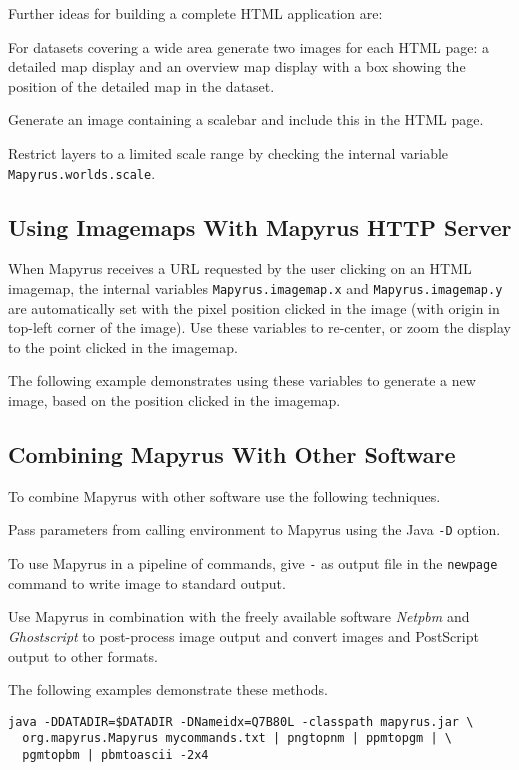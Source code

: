 Further ideas for building a complete HTML application are:

For datasets covering a wide area generate two images for
each HTML page: a detailed map display and an overview map display
with a box showing the position of the detailed map in the dataset.

Generate an image containing a scalebar
and include this in the HTML page.

Restrict layers to a limited scale range by checking the
internal variable
\texttt{Mapyrus.worlds.scale}.

\subsection{Using Imagemaps With Mapyrus HTTP Server}

When Mapyrus receives a URL requested by the user
clicking on an HTML imagemap, the
internal variables
\texttt{Mapyrus.imagemap.x} and
\texttt{Mapyrus.imagemap.y} are automatically set with the pixel position
clicked in the image (with origin in top-left corner of the image).
Use these variables to re-center, or zoom the display to the
point clicked in the imagemap.

The following example demonstrates
using these variables to generate a new image, based on the
position clicked in the imagemap.



\subsection{Combining Mapyrus With Other Software}

To combine Mapyrus with other software use the following
techniques.

Pass parameters from calling environment to Mapyrus using the Java
\texttt{-D} option.

To use Mapyrus in a pipeline of commands,
give \texttt{-} as output file in the
\texttt{newpage}
command to write image to standard output.

Use Mapyrus in combination with the freely available software \textit{Netpbm}
and \textit{Ghostscript} to post-process image output and convert images and
PostScript output to other formats.

The following examples demonstrate these methods.

\begin{verbatim}
java -DDATADIR=$DATADIR -DNameidx=Q7B80L -classpath mapyrus.jar \
  org.mapyrus.Mapyrus mycommands.txt | pngtopnm | ppmtopgm | \
  pgmtopbm | pbmtoascii -2x4
\end{verbatim}

